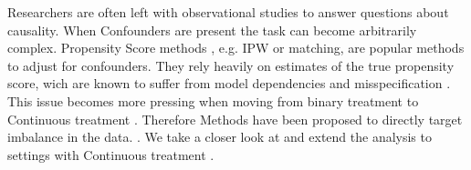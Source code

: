 






Researchers are often left with observational studies to answer questions about causality.
When Confounders are present the task can become arbitrarily complex.
Propensity Score methods 
\cite{Rosenbaum1983},
e.g. IPW or matching,
are popular methods to adjust for confounders.
They rely heavily on estimates of the true propensity score,
wich are known to suffer from model dependencies and misspecification
\cite{Kang2007}.
This issue becomes more pressing when moving from binary treatment to 
Continuous treatment\cite{Hirano2005}%
.%
Therefore Methods have been proposed to directly target imbalance in the data.
\cite{Fong2018}\cite{Hainmueller2012}\cite{Zubizarreta2015}.
We take a closer look at \cite{Wang2019} and extend the analysis to settings with Continuous treatment 
\cite{Vegetabile2020}\cite{Tubbicke2020}.
